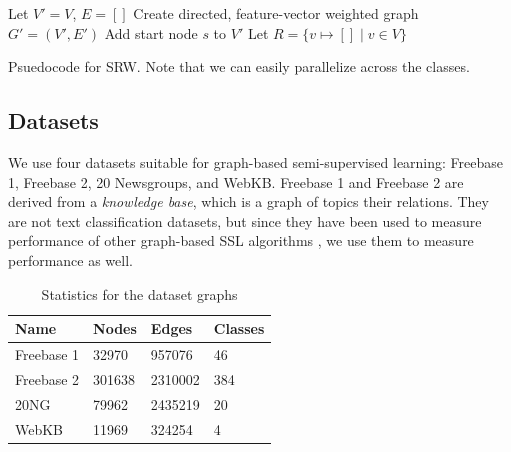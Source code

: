 \documentclass[12pt]{article}
\begin{document}
\begin{algorithm}
  Let $V' = V$, $E = []$\;
  Create directed, feature-vector weighted graph $G' = (V',E')$\;
  Add start node $s$ to $V'$\;
  Let $R = \{ v \mapsto [] \mid v \in V \}$\;
  \caption{Psuedocode for SRW. Note that we can easily parallelize across the classes.\label{fig:srw}}
\end{algorithm}

\subsection{Datasets}
We use four datasets suitable for graph-based semi-supervised learning: Freebase 1, Freebase 2, 20 Newsgroups, and WebKB.
Freebase 1 and Freebase 2 are derived from a \textit{knowledge base}, which is a graph of topics their relations.
They are not text classification datasets, but since they have been used to measure performance of other graph-based SSL algorithms \cite{talukdar2010experiments}, we use them to measure performance as well.

\begin{table}[h]
\centering
\begin{tabular}{|l|l|l|l|}
\hline
\textbf{Name} & \textbf{Nodes} & \textbf{Edges} & \textbf{Classes} \\ \hline
Freebase 1    & 32970             & 957076         & 46               \\ \hline
Freebase 2    & 301638            & 2310002        & 384              \\ \hline
20NG & 79962             & 2435219        & 20               \\ \hline
WebKB & 11969             & 324254        & 4               \\ \hline
\end{tabular}
\caption{Statistics for the dataset graphs}
\label{dataset-stats}
\end{table}
\end{document}
